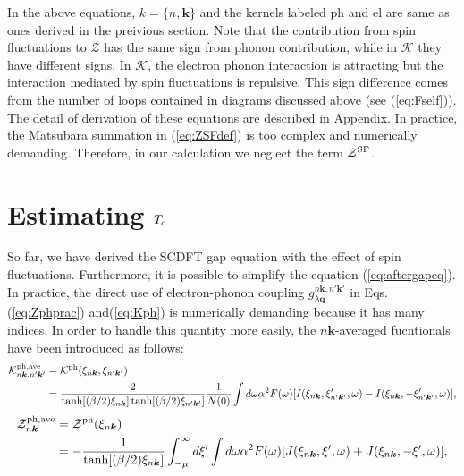 %
In the above equations, $k = \{n,\bm k \}$ and the kernels labeled ph and el are same as ones
derived in the preivious section. Note that the contribution from spin fluctuations to $\mathcal Z$
has the same sign from phonon contribution, while in $\mathcal K$ they have different signs.
In $\mathcal K$, the electron phonon interaction is attracting but the interaction mediated by
spin fluctuations is repulsive.
This sign difference comes from the number of loops contained in diagrams discussed above
(see (\ref{eq:Fself})). The detail of derivation of these equations are described in Appendix.
In practice, the Matsubara summation in (\ref{eq:ZSFdef}) is too complex and numerically demanding.
Therefore, in our calculation we neglect the term ${\mathcal Z}^{\rm SF}$.

\section{Estimating $T_{\rm c}$}
So far, we have derived the SCDFT gap equation with the effect of spin fluctuations.
Furthermore, it is possible to simplify the equation (\ref{eq:aftergapeq}).
In practice, the direct use of electron-phonon coupling $g^{n\bm k,n'\bm k'}_{\lambda\bm q}$ in
Eqs.(\ref{eq:Zphprac}) and(\ref{eq:Kph}) is numerically demanding because it has many indices.
In order to handle this quantity more easily, the $n\bm k$-averaged fucntionals have been
introduced\cite{Marques2005} as follows:
%
\begin{equation}
	\begin{split}
	\mathcal K^{\rm ph, ave}_{n\bm k, n'\bm k'} &= \mathcal K^{\rm ph}(\xi_{n\bm k},\xi_{n'\bm k'}) \\
	& = \frac{2}{\tanh[(\beta/2)\xi_{n\bm k}]\tanh[(\beta/2)\xi_{n'\bm k'}]}
	\frac{1}{N(0)} \int d\omega \alpha^2F(\omega)[I(\xi_{n\bm k},\xi'_{n' \bm k'},\omega) - I(\xi_{n\bm k},-\xi'_{n' \bm k'},\omega)],
	\label{eq:aveKph}
\end{split}
\end{equation}
%
\begin{equation}
	\begin{split}
	\mathcal Z^{\rm ph, ave}_{n \bm k} &= \mathcal Z^{\rm ph}(\xi_{n \bm k}) \\
	& = - \frac{1}{\tanh[(\beta/2)\xi_{n\bm k}]} \int_{-\mu}^{\infty} d\xi'
	\int d\omega \alpha^2F(\omega)[J(\xi_{n\bm k},\xi',\omega) + J(\xi_{n\bm k},-\xi', \omega)],
	\label{eq:aveZph}
\end{split}
\end{equation}
